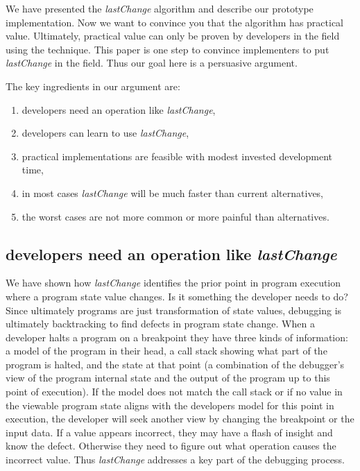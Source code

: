 \documentclass[preprint]{sigplanconf}
\begin{document}
We have presented the \textit{lastChange} algorithm and describe our
prototype implementation. Now we want to convince you that the
algorithm has practical value. Ultimately, practical value can only be
proven by developers in the field using the technique. This paper is
one step to convince implementers to put \textit{lastChange} in the
field.  Thus our goal here is a persuasive argument.

The key ingredients in our argument are: 
\begin{enumerate}
   \item developers need an operation like \textit{lastChange}, 
   \item developers can learn to use \textit{lastChange}, 
   \item practical implementations are feasible with modest
invested development time,
   \item in most cases \textit{lastChange} will be much faster than current alternatives,
   \item the worst cases are not more common or more painful than
alternatives.
\end{enumerate}

\subsection{developers need an operation like \protect\textit{lastChange} }

We have shown how \textit{lastChange} identifies the prior point in
program execution where a program state value changes. Is it something
the developer needs to do?  Since ultimately programs are just
transformation of state values, debugging is ultimately backtracking
to find defects in program state change.  When a developer halts a
program on a breakpoint they have three kinds of information: a model
of the program in their head, a call stack showing what part of the
program is halted, and the state at that point (a combination of the
debugger's view of the program internal state and the output of the
program up to this point of execution). If the model does not match
the call stack or if no value in the viewable program state aligns
with the developers model for this point in execution, the developer
will seek another view by changing the breakpoint or the input
data. If a value appears incorrect, they may have a flash of insight
and know the defect. Otherwise they need to figure out what operation
causes the incorrect value. Thus \textit{lastChange} addresses a key
part of the debugging process.
\end{document}
